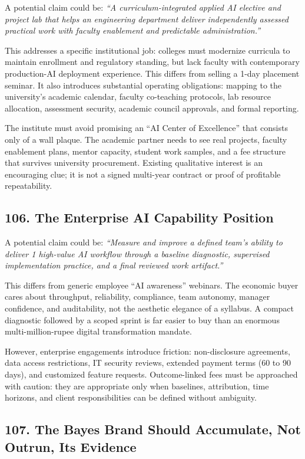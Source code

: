 A potential claim could be: \emph{``A curriculum-integrated applied AI elective and project lab that helps an engineering department deliver independently assessed practical work with faculty enablement and predictable administration.''}

This addresses a specific institutional job: colleges must modernize curricula to maintain enrollment and regulatory standing, but lack faculty with contemporary production-AI deployment experience. This differs from selling a 1-day placement seminar. It also introduces substantial operating obligations: mapping to the university's academic calendar, faculty co-teaching protocols, lab resource allocation, assessment security, academic council approvals, and formal reporting.

The institute must avoid promising an ``AI Center of Excellence'' that consists only of a wall plaque. The academic partner needs to see real projects, faculty enablement plans, mentor capacity, student work samples, and a fee structure that survives university procurement. Existing qualitative interest is an encouraging clue; it is not a signed multi-year contract or proof of profitable repeatability.

\subsection*{106. The Enterprise AI Capability Position}

A potential claim could be: \emph{``Measure and improve a defined team's ability to deliver 1 high-value AI workflow through a baseline diagnostic, supervised implementation practice, and a final reviewed work artifact.''}

This differs from generic employee ``AI awareness'' webinars. The economic buyer cares about throughput, reliability, compliance, team autonomy, manager confidence, and auditability, not the aesthetic elegance of a syllabus. A compact diagnostic followed by a scoped sprint is far easier to buy than an enormous multi-million-rupee digital transformation mandate.

However, enterprise engagements introduce friction: non-disclosure agreements, data access restrictions, IT security reviews, extended payment terms (60 to 90 days), and customized feature requests. Outcome-linked fees must be approached with caution: they are appropriate only when baselines, attribution, time horizons, and client responsibilities can be defined without ambiguity.

\subsection*{107. The Bayes Brand Should Accumulate, Not Outrun, Its Evidence}

